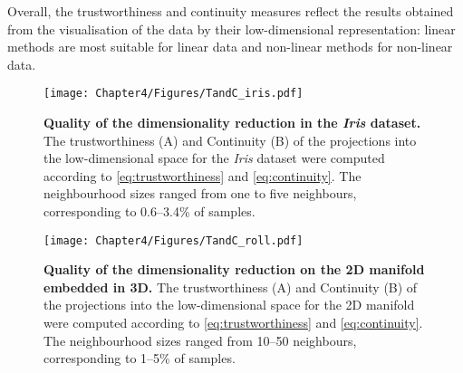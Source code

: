 Overall, the trustworthiness and continuity measures reflect the results obtained from the visualisation of the data by their low-dimensional representation: linear methods are most suitable for linear data and non-linear methods for non-linear data. 

\begin{figure}[hbtp]
	\centering
	\texttt{[image: Chapter4/Figures/TandC\_iris.pdf]}
	\caption[\textbf{Quality of the dimensionality reduction in the \textit{Iris} dataset.}]{\textbf{Quality of the dimensionality reduction in the \textit{Iris} dataset.} The trustworthiness (A)  and Continuity (B) of the projections into the low-dimensional space for the \textit{Iris} dataset were computed according to \cref{eq:trustworthiness} and \cref{eq:continuity}. The neighbourhood sizes ranged from one to five neighbours, corresponding to \numrange{0.6}{3.4}\% of samples.}
	 	\label{fig:TandC-iris}
\end{figure}


\begin{figure}[hbtp]
	\centering
	\texttt{[image: Chapter4/Figures/TandC\_roll.pdf]}
	\caption[\textbf{Quality of the dimensionality reduction on the 2D manifold embedded in 3D.}]{\textbf{Quality of the dimensionality reduction on the 2D manifold embedded in 3D.} The trustworthiness (A)  and Continuity (B) of the projections into the low-dimensional space for the 2D manifold were computed according to \cref{eq:trustworthiness} and \cref{eq:continuity}. The neighbourhood sizes ranged from \numrange{10}{50} neighbours, corresponding to \numrange{1}{5}\% of samples.} 
	 	\label{fig:TandC-roll}
\end{figure}

